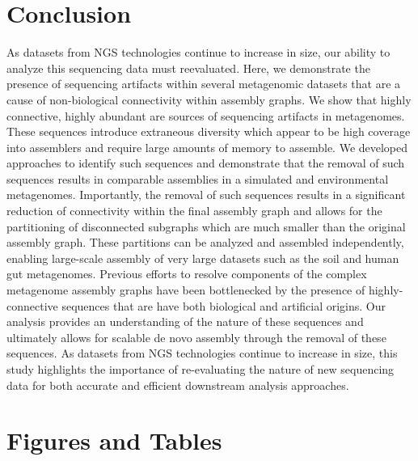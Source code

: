 \documentclass[11pt]{article} %
\begin{document}
\section{Conclusion}

As datasets from NGS technologies continue to increase in size, our ability to analyze this sequencing data must reevaluated.  Here, we demonstrate the presence of sequencing artifacts within several metagenomic datasets that are a cause of non-biological connectivity within assembly graphs.  We show that highly connective, highly abundant are sources of sequencing artifacts in metagenomes.  These sequences introduce extraneous diversity which appear to be high coverage into assemblers and require large amounts of memory to assemble.  We developed approaches to identify such sequences and demonstrate that the removal of such sequences results in comparable assemblies in a simulated and environmental metagenomes.  Importantly, the removal of such sequences results in a significant reduction of connectivity within the final assembly graph and allows for the partitioning of disconnected subgraphs which are much smaller than the original assembly graph.  These partitions can be analyzed and assembled independently, enabling large-scale assembly of very large datasets such as the soil and human gut metagenomes.  Previous efforts to resolve components of the complex metagenome assembly graphs have been bottlenecked by the presence of highly-connective sequences that are have both biological and artificial origins.  Our analysis provides an understanding of the nature of these sequences and ultimately allows for scalable de novo assembly through the removal of these sequences.  As datasets from NGS technologies continue to increase in size, this study highlights the importance of re-evaluating the nature of new sequencing data for both accurate and efficient downstream analysis approaches. 

\section{Figures and Tables}
\end{document}
